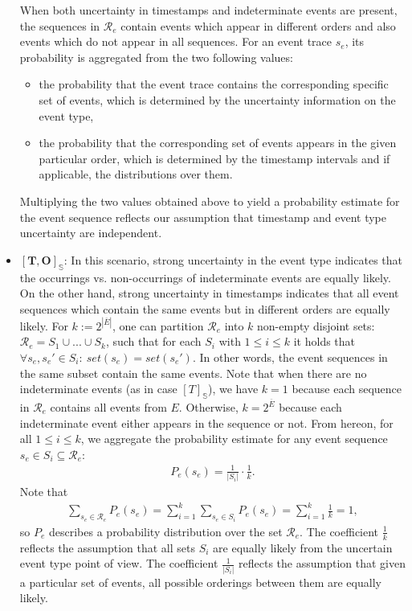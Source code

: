 \begin{itemize}
%
%
%
%
When both uncertainty in timestamps and indeterminate events are present, the sequences in $\mathcal{R}_e$ contain events which appear in different orders and also events which do not appear in all sequences.
For an event trace $s_e$, its probability is aggregated from the two following values:
\begin{itemize}
\item the probability that the event trace contains the corresponding specific set of events, which is determined by the uncertainty information on the event type, 
\item the probability that the corresponding set of events appears in the given particular order, which is determined by the timestamp intervals and if applicable, the distributions over them. 
\end{itemize}
Multiplying the two values obtained above to yield a probability estimate for the event sequence reflects our assumption that timestamp and event type uncertainty are independent.


\item
$\boldsymbol{[T,O]_{\mathbb{S}}}$:
In this scenario, strong uncertainty in the event type indicates that the occurrings vs. non-occurrings of indeterminate events are equally likely.
On the other hand, strong uncertainty in timestamps indicates that all event sequences which contain the same events but in different orders are equally likely.
For $k:=2^{|\overline{E}|}$, one can partition $\mathcal{R}_e$ into $k$ non-empty disjoint sets: $\mathcal{R}_e = S_1 \cup ... \cup S_k$, such that for each $S_i$ with $1 \leq i \leq k$ it holds that $\forall s_e, s_e' \in S_i: ~ set(s_e) = set(s_e')$.
In other words, the event sequences in the same subset contain the same events.
Note that when there are no indeterminate events (as in case $[T]_{\mathbb{S}}$), we have $k=1$ because each sequence in $\mathcal{R}_e$ contains all events from $E$.
Otherwise, $k = 2^{\overline{E}}$ because each indeterminate event either appears in the sequence or not.
From hereon, for all $1 \leq i \leq k$, we aggregate the probability estimate for any event sequence $s_e \in S_i \subseteq \mathcal{R}_e$:
\begin{align*}
P_e(s_e) = \frac{1}{|S_i|} \cdot \frac{1}{k}.
\end{align*}
Note that 
\begin{align*}
\sum_{s_e \in \mathcal{R}_e} P_e(s_e) = \sum_{i=1}^k \sum_{s_e \in S_i} P_e(s_e) = \sum_{i=1}^k \frac{1}{k} = 1,
\end{align*}
so $P_e$ describes a probability distribution over the set $\mathcal{R}_e$.
The coefficient $\frac{1}{k}$ reflects the assumption that all sets $S_i$ are equally likely from the uncertain event type point of view.
The coefficient $\frac{1}{|S_i|}$ reflects the assumption that given a particular set of events, all possible orderings between them are equally likely.


\end{itemize}
